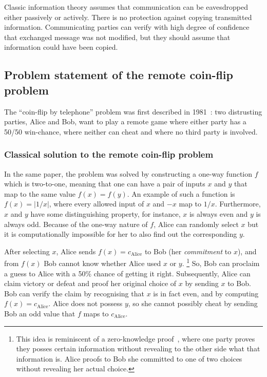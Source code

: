 \documentclass[oneside,a4paper]{article}
\begin{document}

Classic information theory assumes that communication can be eavesdropped either passively or actively. There is no protection against copying transmitted information. Communicating parties can verify with high degree of confidence that exchanged message was not modified, but they should assume that information could have been copied. 


\subsection{Problem statement of the remote coin-flip problem}
The ``coin-flip by telephone'' problem was first described in 1981~\cite{blum1981coin}: two distrusting parties, Alice and Bob, want to play a remote game where either party has a 50/50 win-chance, where neither can cheat and where no third party is involved.


\subsubsection{Classical solution to the remote coin-flip problem}
In the same paper, the problem was solved by constructing a one-way function $f$ which is two-to-one, meaning that one can have a pair of inputs $x$ and $y$ that map to the same value $f(x)=f(y)$. An example of such a function is $f(x) =|1/x|$, where every allowed input of $x$ and $-x$ map to $1/x$. Furthermore, $x$ and $y$ have some distinguishing property, for instance, $x$ is always even and $y$ is always odd. Because of the one-way nature of $f$, Alice can randomly select $x$ but it is computationally impossible for her to also find out the corresponding $y$.

After selecting $x$, Alice sends $f(x)=c_{\text{Alice}}$ to Bob (her \textit{commitment} to $x$), and from $f(x)$ Bob cannot know whether Alice used $x$ or $y$.
\footnote{
    This idea is reminiscent of a zero-knowledge proof~\cite{goldwasser1989knowledge}, where one party proves they posses certain information without revealing to the other side what that information is.
    Alice proofs to Bob she committed to one of two choices without revealing her actual choice.
}
So, Bob can proclaim a guess to Alice with a 50\% chance of getting it right.
Subsequently, Alice can claim victory or defeat and proof her original choice of $x$ by sending $x$ to Bob.
Bob can verify the claim by recognising that $x$ is in fact even, and by computing $f(x)=c_{\text{Alice}}$.
Alice does not possess $y$, so she cannot possibly cheat by sending Bob an odd value that $f$ maps to $c_{\text{Alice}}$.
\end{document}
